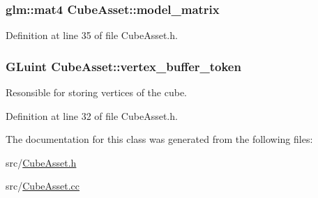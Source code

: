 \hypertarget{class_cube_asset_a49b69783f209cc8268a8be7d46c803d6}{}
\subsubsection[{model\+\_\+matrix}]{\setlength{\rightskip}{0pt plus 5cm}glm\+::mat4 Cube\+Asset\+::model\+\_\+matrix\hspace{0.3cm}{\ttfamily [private]}}\label{class_cube_asset_a49b69783f209cc8268a8be7d46c803d6}


Definition at line 35 of file Cube\+Asset.\+h.

\hypertarget{class_cube_asset_a31bd098f60e2c24988316a9cc9335987}{}
\subsubsection[{vertex\+\_\+buffer\+\_\+token}]{\setlength{\rightskip}{0pt plus 5cm}G\+Luint Cube\+Asset\+::vertex\+\_\+buffer\+\_\+token\hspace{0.3cm}{\ttfamily [private]}}\label{class_cube_asset_a31bd098f60e2c24988316a9cc9335987}
Resonsible for storing vertices of the cube. 

Definition at line 32 of file Cube\+Asset.\+h.



The documentation for this class was generated from the following files\+:\begin{DoxyCompactItemize}
\item 
src/\hyperlink{_cube_asset_8h}{Cube\+Asset.\+h}\item 
src/\hyperlink{_cube_asset_8cc}{Cube\+Asset.\+cc}\end{DoxyCompactItemize}

